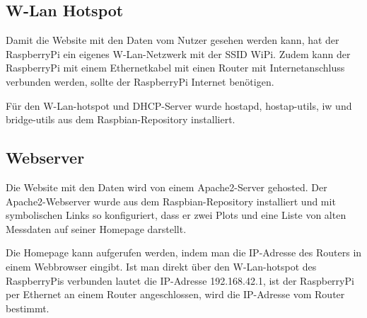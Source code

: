 \documentclass{article}
\begin{document}
\subsection{W-Lan Hotspot}
Damit die Website mit den Daten vom Nutzer gesehen werden kann, hat der RaspberryPi ein eigenes W-Lan-Netzwerk mit der SSID WiPi.
Zudem kann der RaspberryPi mit einem Ethernetkabel mit einen Router mit Internetanschluss verbunden werden, sollte der RaspberryPi Internet benötigen.

Für den W-Lan-hotspot und DHCP-Server wurde hostapd, hostap-utils, iw und bridge-utils aus dem Raspbian-Repository installiert.

\subsection{Webserver}
Die Website mit den Daten wird von einem Apache2-Server gehosted.
Der Apache2-Webserver wurde aus dem Raspbian-Repository installiert und mit symbolischen Links so konfiguriert, dass er zwei Plots und eine Liste von alten Messdaten auf seiner Homepage darstellt.

Die Homepage kann aufgerufen werden, indem man die IP-Adresse des Routers in einem Webbrowser eingibt.
Ist man direkt über den W-Lan-hotspot des RaspberryPis verbunden lautet die IP-Adresse 192.168.42.1, ist der RaspberryPi per Ethernet an einem Router angeschlossen, wird die IP-Adresse vom Router bestimmt.
\end{document}
